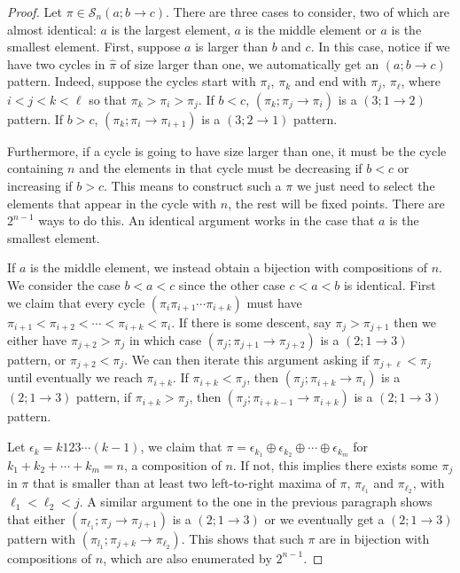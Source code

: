 \documentclass[11pt]{article}
\renewcommand\S{\mathcal S}
\theoremstyle{definition}
\begin{document}
\begin{proof}
    Let $\pi \in \S_n(a;b\to c)$. There are three cases to consider, two of which are almost identical: $a$ is the largest element, $a$ is the middle element or $a$ is the smallest element. First, suppose $a$ is larger than $b$ and $c$. In this case, notice if we have two cycles in $\hat\pi$ of size larger than one, we automatically get an $(a; b\to c)$ pattern. Indeed, suppose the cycles start with $\pi_i$, $\pi_k$ and end with $\pi_j$, $\pi_{\ell}$, where $i < j < k < \ell$ so that $\pi_k > \pi_i > \pi_j$. If $b < c$, $(\pi_k; \pi_j \to \pi_i)$ is a $(3; 1 \to 2)$ pattern. If $b > c$, $(\pi_k; \pi_i \to \pi_{i+1})$ is a $(3; 2 \to 1)$ pattern.

    Furthermore, if a cycle is going to have size larger than one, it must be the cycle containing $n$ and the elements in that cycle must be decreasing if $b < c$ or increasing if $b > c$. This means to construct such a $\pi$ we just need to select the elements that appear in the cycle with $n$, the rest will be fixed points. There are $2^{n-1}$ ways to do this. An identical argument works in the case that $a$ is the smallest element.

    If $a$ is the middle element, we instead obtain a bijection with compositions of $n$. We consider the case $b < a < c$ since the other case $c < a< b$ is identical. First we claim that every cycle $(\pi_i \pi_{i+1} \cdots\pi_{i+k})$ must have $\pi_{i+1} < \pi_{i+2} < \cdots < \pi_{i+k} < \pi_i$. If there is some descent, say $\pi_{j} > \pi_{j+1}$ then we either have $\pi_{j+2} > \pi_j$ in which case $(\pi_j; \pi_{j+1} \to \pi_{j+2})$ is a $(2; 1 \to 3)$ pattern, or $\pi_{j+2} < \pi_j$. We can then iterate this argument asking if $\pi_{j+\ell} < \pi_j$ until eventually we reach $\pi_{i+k}$. If $\pi_{i+k} < \pi_j$, then $(\pi_j; \pi_{i+k} \to \pi_i)$ is a $(2; 1 \to 3)$ pattern, if $\pi_{i+k} > \pi_{j}$, then $(\pi_j; \pi_{i+k-1} \to \pi_{i+k})$ is a $(2;1 \to 3)$ pattern.

    Let $\epsilon_k = k123\cdots(k-1)$, we claim that $\pi = \epsilon_{k_1} \oplus \epsilon_{k_2} \oplus \cdots \oplus \epsilon_{k_m}$ for $k_1 + k_2 + \cdots + k_m = n$, a composition of $n$. If not, this implies there exists some $\pi_j$ in $\pi$ that is smaller than at least two left-to-right maxima of $\pi$, $\pi_{\ell_1}$ and $\pi_{\ell_2}$, with $\ell_1 < \ell_2 < j$. A similar argument to the one in the previous paragraph shows that either $(\pi_{\ell_1}; \pi_j \to \pi_{j+1})$ is a $(2; 1\to 3)$ or we eventually get a $(2; 1\to 3)$ pattern with $(\pi_{l_1}; \pi_{j+k} \to \pi_{\ell_2})$. This shows that such $\pi$ are in bijection with compositions of $n$, which are also enumerated by $2^{n-1}$.
\end{proof}
\end{document}

